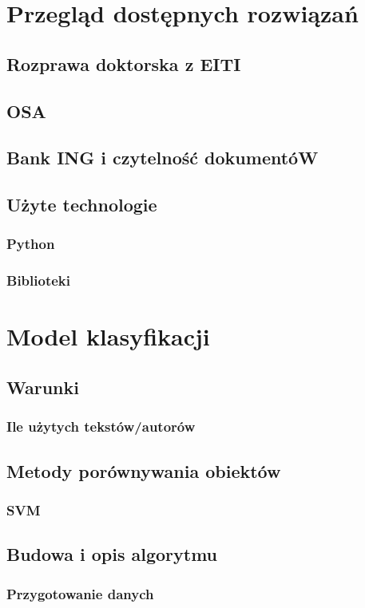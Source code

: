 \documentclass[a4paper,12pt,twoside,openany]{report}
\begin{document}
\chapter{Przegląd dostępnych rozwiązań}

\section{Rozprawa doktorska z EITI}
\section{OSA}
\section{Bank ING i czytelność dokumentóW}
\section{Użyte technologie}
\subsection{Python}
\subsection{Biblioteki}

\chapter{Model klasyfikacji}
\section{Warunki}
\subsection{Ile użytych tekstów/autorów}
\section{Metody porównywania obiektów}
\subsection{SVM}

\section{Budowa i opis algorytmu}
\subsection{Przygotowanie danych}
\end{document}
